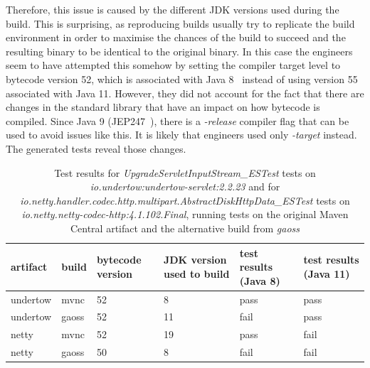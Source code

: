 \documentclass[conference]{IEEEtran}
\begin{document}
Therefore, this issue is caused by the different JDK versions used during the build. This is surprising, as reproducing builds usually try to replicate the build environment in order to maximise the chances of the build to succeed and the resulting binary to be identical to the original binary. In this case the engineers seem to have attempted this somehow by setting the compiler target level to bytecode version 52, which is associated with Java 8~\cite[Sect. 4.1]{JVM17Spec} instead of using version 55 associated with Java 11.  However, they did not account for the fact that there are changes in the standard library that have an impact on how bytecode is compiled. Since Java 9 (JEP247~\cite{jep247}), there is a \textit{-release} compiler  flag that can be used to avoid issues like this. It is likely that engineers used only \textit{-target} instead. The generated tests reveal those changes.  

\begin{table}[h]
	\centering
    \caption{Test results for \textit{UpgradeServletInputStream\_ESTest} tests on \textit{io.undertow:undertow-servlet:2.2.23} and for \textit{io.netty.handler.codec.http.multipart.AbstractDiskHttpData\_ESTest} tests on \textit{io.netty.netty-codec-http:4.1.102.Final}, running tests on the original Maven Central artifact and the alternative build from \textit{gaoss}}
    
	\begin{tabular}{p{0.8cm}p{0.5cm}p{0.9cm}p{1.6cm}p{1.3cm}p{1.3cm}}
		\toprule
		\textbf{artifact} & \textbf{build}         & \textbf{bytecode version} & \textbf{JDK version used to build} & \textbf{test results (Java 8)}                                                    & \textbf{test results (Java 11)} \\ \midrule
		undertow & mvnc & 52               & 8                         & pass                                                                     & pass                   \\
		undertow & gaoss         & 52               & 11                        & fail & pass                  \\ \hline
		netty & mvnc & 52               & 19                         & pass                                                                     & fail                   \\
		netty & gaoss         & 50               & 8                        & fail & fail                  \\ \bottomrule
	\end{tabular}
	
	\label{tab:nosuchmethoderror}
\end{table}
\end{document}
